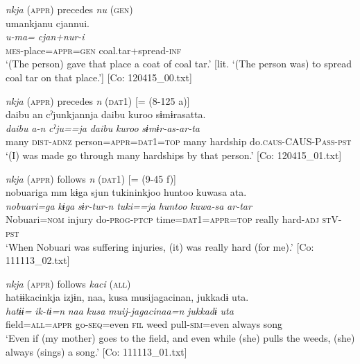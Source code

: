   \ex  \textit{nkja} (\textsc{appr}) precedes \textit{nu} (\textsc{gen})\\

      \glll    umankjanu  cjannui.\\
      \textit{u-ma=}  \textit{cjan+nur-i}\\
      \textsc{mes}-place=\textsc{appr}=\textsc{gen}  coal.tar+spread-\textsc{inf}\\
    \glt   ‘(The person) gave that place a coat of coal tar.’ [lit. ‘(The person was) to spread coal tar on that place.’]      [Co: 120415\_00.txt]

  \ex  \textit{nkja} (\textsc{appr}) precedes \textit{n} (\textsc{dat}1) [= (8-125 a)]\\
      \glll    {\textbar}daibu{\textbar}  an  cˀjunkjannja  {\textbar}daibu  kuroo{\textbar}  sɨmɨrasatta.\\
      \textit{daibu}  \textit{a-n}  \textit{cˀju==ja}  \textit{daibu}  \textit{kuroo} \textit{sɨmɨr-as-ar-ta}\\
      many  \textsc{dist}-\textsc{adnz}  person=\textsc{appr}=\textsc{dat}1=\textsc{top}  many  hardship   do.\textsc{caus}-CAUS-P\textsc{ass}-\textsc{pst}\\
      \glt       ‘(I) was made go through many hardships by that person.’ [Co: 120415\_01.txt]

  \ex \textit{nkja} (\textsc{appr}) follows \textit{n} (\textsc{dat}1) [= (9-45 f)]\\
      \glll    nobuariga  mm  kɨga  sjun  tukininkjoo  huntoo  kuwasa  ata.\\
      \textit{nobuari=ga}    \textit{kɨga}  \textit{sɨr-tur-n}  \textit{tuki==ja}  \textit{huntoo}  \textit{kuwa-sa}  \textit{ar-tar}\\
      Nobuari=\textsc{nom}    injury  do-\textsc{prog}-\textsc{ptcp}  time=\textsc{dat}1=\textsc{appr}=\textsc{top}  really  hard-\textsc{adj}  \textsc{st}V-\textsc{pst}\\
      \glt       ‘When Nobuari was suffering injuries, (it) was really hard (for me).’ [Co: 111113\_02.txt]

   \ex  \textit{nkja} (\textsc{appr}) follows \textit{kaci} (\textsc{all})\\
      \glll    hatɨɨkacinkja  izjɨn,  naa,  kusa  musijagacinan,  jukkadɨ  uta.      \\
      \textit{hatɨɨ=}  \textit{ik-tɨ=n}  \textit{naa}  \textit{kusa}  \textit{muij-jagacinaa=n}  \textit{jukkadɨ}  \textit{uta}      \\
      field=\textsc{all}=\textsc{appr}  go-\textsc{seq}=even  \textsc{fil}  weed  pull-\textsc{sim}=even  always  song\\
      \glt       ‘Even if (my mother) goes to the field, and even while (she) pulls the weeds, (she) always (sings) a song.’ [Co: 111113\_01.txt]

